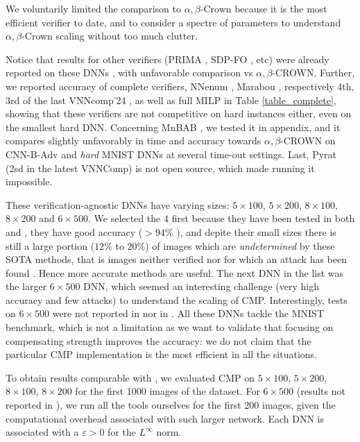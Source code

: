 We voluntarily limited the comparison to $\alpha,\beta$-Crown because it is the most efficient verifier to date, and to consider a spectre of parameters to understand $\alpha,\beta$-Crown scaling without too much clutter.

Notice that results for other verifiers (PRIMA \cite{prima}, SDP-FO \cite{SDPFI}, etc) were already reported on these DNNs \cite{crown}, with unfavorable comparison vs $\alpha,\beta$-CROWN. Further, we reported accuracy of complete verifiers, NNenum \cite{nnenum}, Marabou \cite{Marabou, Marabou2}, respectively 4th, 3rd 
of the last VNNcomp'24 \cite{VNNcomp24}, as well as full MILP \cite{MILP} in Table \ref{table_complete}, showing that these verifiers are not competitive on hard instances either, even on the smallest hard DNN. Concerning MnBAB \cite{ferrari2022complete}, we tested it in appendix, and it compares slightly unfavorably in time and accuracy towards $\alpha,\beta$-CROWN on CNN-B-Adv and {\em hard} MNIST DNNs at several time-out settings. 
Last, Pyrat \cite{pyrat} (2sd in the latest VNNComp) is not open source, which made running it impossible.




\iffalse

These verification-agnostic DNNs have varying sizes: $5\times 100$, $5\times 200$, $8 \times 100$, $8 \times 200$ and $6 \times 500$. We selected the 4 first because they have been tested in both \cite{prima} and \cite{crown}, they have good accuracy ($>94\%$ \cite{prima}), 
and depite their small sizes there is still a large portion ($12\%$ to $20\%$) of images which are {\em undetermined} by these SOTA methods, that is images neither verified nor for which an attack has been found  \cite{attack}. Hence more accurate methods are useful. 
The next DNN in the list was the larger $6 \times 500$ DNN, which seemed an interesting challenge (very high accuracy and few attacks) to understand the scaling of CMP. Interestingly, tests on $6 \times 500$ were not reported in \cite{prima} nor in \cite{crown}. All these DNNs tackle the MNIST benchmark, which is not a limitation as we want to validate that focusing on compensating strength improves the accuracy: we do not claim that the particular CMP implementation is the most efficient in all the situations.

To obtain results comparable with \cite{prima,crown}, 
we evaluated CMP on $5\times 100$, $5\times 200$, $8 \times 100$, $8 \times 200$ for the first 1000 images of the dataset. For $6\times 500$ (results not reported in \cite{prima,crown}), we run all the tools ourselves for the first 200 images, given the computational overhead associated with such larger network. Each DNN is associated with a $\varepsilon>0$ for the $L^\infty$ norm.

